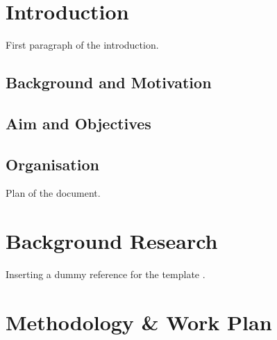 \documentclass[12pt,nonacm,acmlarge,titlepage,screen]{acmart}
\begin{document}


\newpage
{}






	
\newpage
{}

\section{Introduction} \label{cha:intro}

First paragraph of the introduction.

\subsection{Background and Motivation} \label{sec:intro_motiv}

\subsection{Aim and Objectives} \label{sec:intro_aim}

\subsection{Organisation} \label{sec:intro_orga}

Plan of the document.

\section{Background Research} \label{cha:back}

Inserting a dummy reference for the template \cite{turing_computing_2009}.

\section{Methodology \& Work Plan} \label{sec:method}
\end{document}
